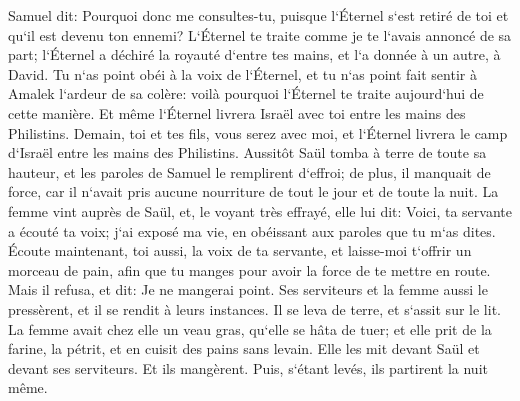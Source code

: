 \verse Samuel dit: Pourquoi donc me consultes-tu, puisque l`Éternel s`est retiré de toi et qu`il est devenu ton ennemi? 
\verse L`Éternel te traite comme je te l`avais annoncé de sa part; l`Éternel a déchiré la royauté d`entre tes mains, et l`a donnée à un autre, à David. 
\verse Tu n`as point obéi à la voix de l`Éternel, et tu n`as point fait sentir à Amalek l`ardeur de sa colère: voilà pourquoi l`Éternel te traite aujourd`hui de cette manière. 
\verse Et même l`Éternel livrera Israël avec toi entre les mains des Philistins. Demain, toi et tes fils, vous serez avec moi, et l`Éternel livrera le camp d`Israël entre les mains des Philistins. 
\verse Aussitôt Saül tomba à terre de toute sa hauteur, et les paroles de Samuel le remplirent d`effroi; de plus, il manquait de force, car il n`avait pris aucune nourriture de tout le jour et de toute la nuit. 
\verse La femme vint auprès de Saül, et, le voyant très effrayé, elle lui dit: Voici, ta servante a écouté ta voix; j`ai exposé ma vie, en obéissant aux paroles que tu m`as dites. 
\verse Écoute maintenant, toi aussi, la voix de ta servante, et laisse-moi t`offrir un morceau de pain, afin que tu manges pour avoir la force de te mettre en route. 
\verse Mais il refusa, et dit: Je ne mangerai point. Ses serviteurs et la femme aussi le pressèrent, et il se rendit à leurs instances. Il se leva de terre, et s`assit sur le lit. 
\verse La femme avait chez elle un veau gras, qu`elle se hâta de tuer; et elle prit de la farine, la pétrit, et en cuisit des pains sans levain. 
\verse Elle les mit devant Saül et devant ses serviteurs. Et ils mangèrent. Puis, s`étant levés, ils partirent la nuit même. 

